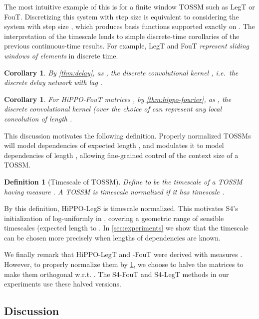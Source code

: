 \documentclass{article}
\newtheorem{corollary}[lemma]{Corollary}
\newtheorem{definition}{Definition}
\begin{document}
The most intuitive example of this is for a finite window TOSSM such as LegT or FouT. Discretizing this system with step size  is equivalent to considering the system  with step size , which produces basis functions supported exactly on .
The interpretation of the timescale  lends to simple discrete-time corollaries of the previous continuous-time results.
For example, LegT and FouT \emph{represent sliding windows of  elements} in discrete time.
\begin{corollary}\label{cor:delay}
  By \cref{thm:delay}, as , the discrete convolutional kernel , i.e.\ the discrete delay network with lag .
\end{corollary}

\begin{corollary}\label{cor:fourier-kernel}
  For HiPPO-FouT matrices ,
  by \cref{thm:hippo-fourier}, as , the discrete convolutional kernel  (over the choice of  can represent any local convolution of length .
\end{corollary}

This discussion motivates the following definition.
Properly normalized TOSSMs  will model dependencies of expected length ,
and  modulates it to model dependencies of length ,
allowing fine-grained control of the context size of a TOSSM.
\begin{definition}[Timescale of TOSSM]\label{def:timescale}
  Define  to be the \emph{timescale} of a TOSSM having measure .
  A TOSSM is \emph{timescale normalized} if it has timescale .
\end{definition}
By this definition, HiPPO-LegS is timescale normalized. This motivates S4's initialization of  log-uniformly in , covering a geometric range of sensible timescales (expected length  to .
In \cref{sec:experiments} we show that the timescale can be chosen more precisely when lengths of dependencies are known.




We finally remark that HiPPO-LegT and -FouT were derived with measures . However, to properly normalize them by \cref{def:timescale}, we choose to halve the matrices to make them orthogonal w.r.t. .
The S4-FouT and S4-LegT methods in our experiments use these halved versions. 

\subsection{Discussion}
\end{document}
